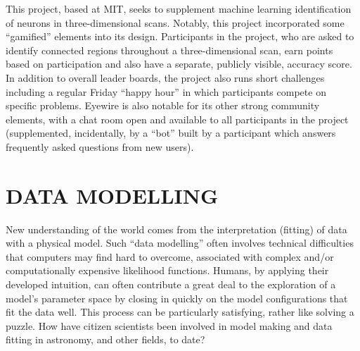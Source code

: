 \documentclass{ar2e}
\begin{document}
  This project,
based at MIT, seeks to supplement machine learning identification of neurons in
three-dimensional scans. Notably, this project incorporated some ``gamified''
elements into its design. Participants in the project, who are asked to identify
connected regions throughout a three-dimensional scan, earn points based on
participation and also have a separate, publicly visible, accuracy score.  In
addition to overall leader boards, the project also runs short challenges
including a regular Friday ``happy hour'' in which participants compete on
specific problems. Eyewire is also notable for its other strong community
elements, with a chat room open and available to all participants in the project
(supplemented, incidentally, by a ``bot'' built by a participant which answers
frequently asked questions from new users). 



\section{DATA MODELLING}
\label{sec:model}

New understanding of the world comes from the interpretation (fitting) of data
with a physical model. Such ``data modelling'' often involves technical
difficulties that computers may find hard to overcome, associated with complex
and/or computationally expensive likelihood functions. Humans, by applying their
developed intuition, can often contribute a great deal to the exploration of a
model's parameter space by closing in quickly on the model configurations that
fit the data well. This process can be particularly satisfying, rather like
solving a puzzle. How have citizen scientists been involved in model making and
data fitting in astronomy, and other fields, to date?
\end{document}
